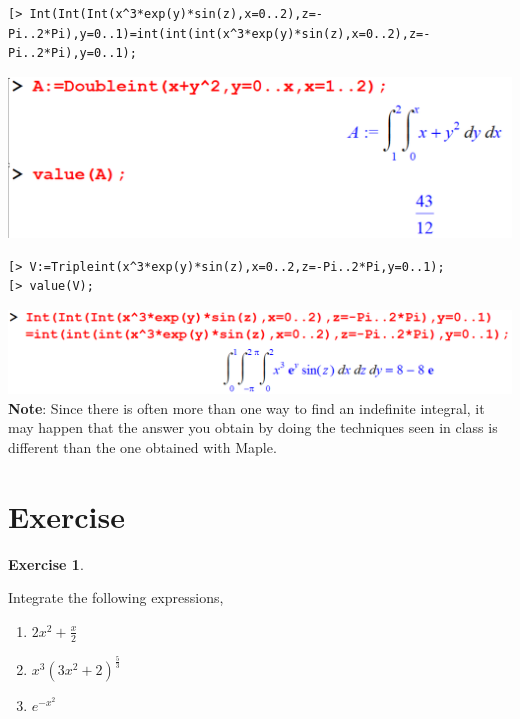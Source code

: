 \documentclass[
]{book}
\providecommand{\tightlist}{%
  \setlength{\itemsep}{0pt}\setlength{\parskip}{0pt}}
\theoremstyle{definition}
\theoremstyle{definition}
\theoremstyle{definition}
\newtheorem{exercise}{Exercise}[chapter]
\theoremstyle{definition}
\theoremstyle{remark}
\begin{document}
\begin{verbatim}
[> Int(Int(Int(x^3*exp(y)*sin(z),x=0..2),z=-Pi..2*Pi),y=0..1)=int(int(int(x^3*exp(y)*sin(z),x=0..2),z=-Pi..2*Pi),y=0..1);
\end{verbatim}

\includegraphics{figures/Lesson 6/fig25.png}

\begin{verbatim}
[> V:=Tripleint(x^3*exp(y)*sin(z),x=0..2,z=-Pi..2*Pi,y=0..1);
[> value(V);
\end{verbatim}

\includegraphics{figures/Lesson 6/fig26.png}
\textbf{Note}: Since there is often more than one way to find an indefinite integral, it may happen that the answer you obtain by doing the techniques seen in class is different than the one obtained with Maple.

\section{Exercise}\label{exercise-2}

\begin{exercise}
\protect\hypertarget{exr:unnamed-chunk-13}{}\label{exr:unnamed-chunk-13}

Integrate the following expressions,

\begin{enumerate}
\def\labelenumi{\roman{enumi}.}
\tightlist
\item
  \(2x^2 + \frac{x}{2}\)
\item
  \(x^3(3x^2 + 2)^{\frac{5}{3}}\)
\item
  \(e^{-x^2}\)
\end{enumerate}

\end{exercise}
\end{document}
